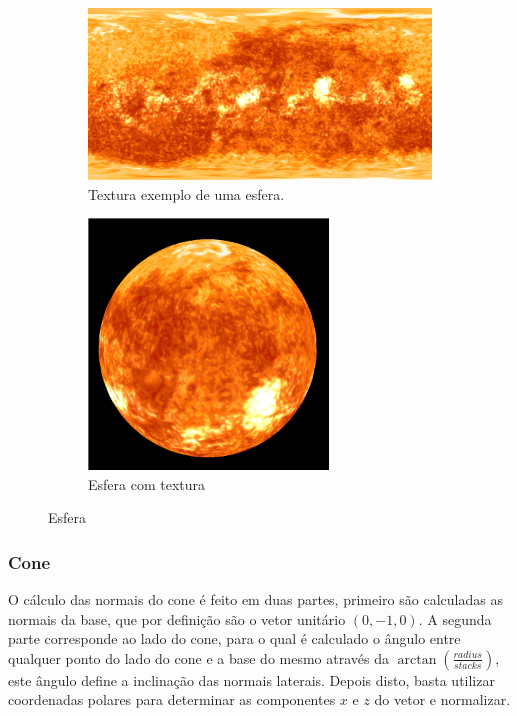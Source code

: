 \documentclass[a4paper]{article}
\begin{document}
\begin{figure}[H]
    \centering
    \begin{subfigure}{0.4\textwidth}
        \centering
        \includegraphics[width=\textwidth]{../assets/2k_sun.jpg}
        \caption{Textura exemplo de uma esfera.}
    \end{subfigure}
    \begin{subfigure}{0.4\textwidth}
        \centering
        \includegraphics[width=0.7\textwidth]{sphere.png}
        \caption{Esfera com textura}
    \end{subfigure}
    \caption{Esfera}
\end{figure}

\subsubsection{Cone}
O cálculo das normais do cone é feito em duas partes, primeiro são calculadas
as normais da base, que por definição são o vetor unitário $(0,-1,0)$. A
segunda parte corresponde ao lado do cone, para o qual é calculado o ângulo
entre qualquer ponto do lado do cone e a base do mesmo através da
$\arctan(\frac{radius}{stacks})$, este ângulo define a
inclinação das normais laterais. Depois disto, basta utilizar coordenadas
polares para determinar as componentes $x$ e $z$ do vetor e normalizar.
\end{document}
